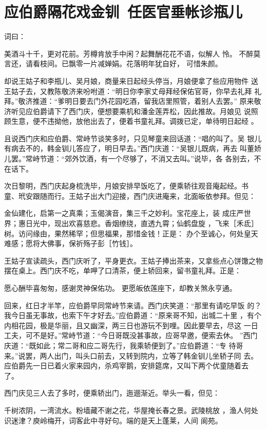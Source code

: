 \chapter{应伯爵隔花戏金钏~任医官垂帐诊瓶儿}

词曰：

美酒斗十千，更对花前。芳樽肯放手中闲？起舞酬花花不语，似解人
怜。  不醉莫言还，请看枝间。已飘零一片减婵娟。花落明年犹自好，
可惜朱颜。

却说王姑子和李瓶儿、吴月娘，商量来日起经头停当，月娘便拿了些应用物件
送王姑子去，又教陈敬济来吩咐道：“明日你李家丈母拜经保佑官哥，你早去礼拜
礼拜。”敬济推道：“爹明日要去门外花园吃酒，留我店里照管，着别人去罢。”
原来敬济听见应伯爵请下了西门庆，便想要乘机和潘金莲弄松，因此推故。月娘见
说照顾生意，便不违拗他，放他出去了，便着书童礼拜。调拨已定，单待明日起经
。

且说西门庆和应伯爵、常峙节谈笑多时，只见琴童来回话道：“唱的叫了。吴
银儿有病去不的，韩金钏儿答应了，明日早去。”西门庆道：“吴银儿既病，再去
叫董娇儿罢。”常峙节道：“郊外饮酒，有一个尽够了，不消又去叫。”说毕，各
各别去，不在话下。

次日黎明，西门庆起身梳洗毕，月娘安排早饭吃了，便乘轿往观音庵起经。书
童、玳安跟随而行。王姑子出大门迎接，西门庆进庵来，北面皈依参拜。但见：

金仙建化，启第一之真乘；玉偈演音，集三千之妙利。宝花座上，装
成庄严世界；惠日光中，现出欢喜慈悲。香烟缭绕，直透九霄；仙鹤盘旋
，飞来［禾氐］树。访问缘由，果然稀罕；但思福果，那惜金钱！正是：
办个至诚心，何处皇天难感；愿将大佛事，保祈殇子彭［竹钱］。

王姑子宣读疏头，西门庆听了，平身更衣。王姑子捧出茶来，又拿些点心饼馓之物
摆在桌上。西门庆不吃，单呷了口清茶，便上轿回来，留书童礼拜。正是：

愿心酬毕喜匆匆，感谢灵神保佑功。
更愿皈依莲座下，却教关煞永亨通。

回来，红日才半竿，应伯爵早同常峙节来请。西门庆笑道：“那里有请吃早饭
的？我今日虽无事故，也索下午才好去。”应伯爵道：“原来哥不知，出城二十里
，有个内相花园，极是华丽，且又幽深，两三日也游玩不到哩。因此要早去，尽这
一日工夫，可不是好。”常峙节道：“今日哥既没甚事故，应哥早邀，便索去休。
”西门庆道：“既如此；常二哥和应二哥先行，我乘轿便到了。”应伯爵道：“专
待哥来。”说罢，两人出门，叫头口前去，又转到院内，立等了韩金钏儿坐轿子同
去。应伯爵先一日已着火家来园内，杀鸡宰鹅，安排筵席，又叫下两个优童随着去
了。

西门庆见三人去了多时，便乘轿出门，迤逦渐近。举头一看，但见：

千树浓阴，一湾流水。粉墙藏不谢之花，华屋掩长春之景。武陵桃放
，渔人何处识迷津？庾岭梅开，词客此中寻好句。端的是天上蓬莱，人间
阆苑。

